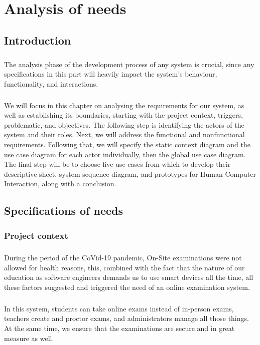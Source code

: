 \documentclass[]{uc2pfecaneva}
\begin{document}
    \setlength{\parskip}{6pts}
    \tableofcontents
    \listoffigures
    \listoftables
    \chapter{Analysis of needs}

    \newpage

    \raggedright\section{Introduction}
    \justifying\paragraph{}
    The analysis phase of the development process of any system is crucial, since any specifications in this part will heavily impact the system's behaviour, functionality, and interactions.
    \justifying\paragraph{}
    We will focus in this chapter on analysing the requirements for our system, as well as establishing its boundaries, starting with the project context, triggers, problematic, and objectives. The following step is identifying the actors of the system and their roles. Next, we will address the functional and nonfunctional requirements. Following that, we will specify the static context diagram and the use case diagram for each actor individually, then the global use case diagram. The final step will be to choose five use cases from which to develop their descriptive sheet, system sequence diagram, and prototypes for Human-Computer Interaction, along with a conclusion.

    \raggedright\section{Specifications of needs}
    \subsection{Project context}
    \justifying\paragraph{}
    During the period of the CoVid-19 pandemic, On-Site examinations were not allowed for health reasons, this, combined with the fact that the nature of our education as software engineers demands us to use smart devices all the time, all these factors suggested and triggered the need of an online examination system.
    \justifying\paragraph{}
    In this system, students can take online exams instead of in-person exams, teachers create and proctor exams, and administrators manage all those things. At the same time, we ensure that the examinations are secure and in great measure as well.
\end{document}
